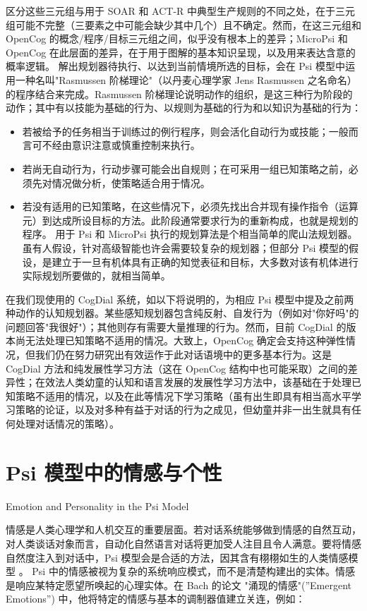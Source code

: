 区分这些三元组与用于 SOAR 和 ACT-R 中典型生产规则的不同之处，在于三元组可能不完整（三要素之中可能会缺少其中几个）且不确定。然而，在这三元组和 OpenCog 的概念/程序/目标三元组之间，似乎没有根本上的差异；MicroPsi 和 OpenCog 在此层面的差异，在于用于图解的基本知识呈现，以及用来表达含意的概率逻辑。
解出规划器待执行、以达到当前情境所选的目标，会在 Psi 模型中运用一种名叫"Rasmussen 阶梯理论"（以丹麦心理学家 Jens Rasmussen 之名命名）的程序结合来完成。Rasmussen 阶梯理论说明动作的组织，是这三种行为阶段的动作；其中有以技能为基础的行为、以规则为基础的行为和以知识为基础的行为：

\begin{itemize}
\item 若被给予的任务相当于训练过的例行程序，则会活化自动行为或技能；一般而言可不经由意识注意或慎重控制来执行。 
\item 若尚无自动行为，行动步骤可能会出自规则；在可采用一组已知策略之前，必须先对情况做分析，使策略适合用于情况。 
\item 若没有适用的已知策略，在这些情况下，必须先找出合并现有操作指令（运算元）到达成所设目标的方法。此阶段通常要求行为的重新构成，也就是规划的程序。
用于 Psi 和 MicroPsi 执行的规划算法是个相当简单的爬山法规划器。虽有人假设，针对高级智能也许会需要较复杂的规划器；但部分 Psi 模型的假设，是建立于一旦有机体具有正确的知觉表征和目标，大多数对该有机体进行实际规划所要做的，就相当简单。
\end{itemize}


在我们现使用的 CogDial 系统，如以下将说明的，为相应 Psi 模型中提及之前两种动作的认知规划器。某些感知规划器包含纯反射、自发行为（例如对"你好吗"的问题回答"我很好"）；其他则存有需要大量推理的行为。然而，目前 CogDial 的版本尚无法处理已知策略不适用的情况。大致上，OpenCog 确定会支持这种弹性情况，但我们仍在努力研究出有效运作于此对话语境中的更多基本行为。这是 CogDial 方法和纯发展性学习方法（这在 OpenCog 结构中也可能采取）之间的差异性；在效法人类幼童的认知和语言发展的发展性学习方法中，该基础在于处理已知策略不适用的情况，以及在此等情况下学习策略（虽有出生即具有相当高水平学习策略的论证，以及对多种有益于对话的行为之成见，但幼童并非一出生就具有任何处理对话情况的策略）。

\section{Psi 模型中的情感与个性}{Emotion and Personality in the Psi Model}

情感是人类心理学和人机交互的重要层面。若对话系统能够做到情感的自然互动，对人类谈话对象而言，自动化自然语言对话将更加受人注目且令人满意。要将情感自然度注入到对话中，Psi 模型会是合适的方法，因其含有栩栩如生的人类情感模型 。
Psi 中的情感被视为复杂的系统响应模式，而不是清楚构建出的实体。情感是响应某特定愿望所唤起的心理实体。在 Bach 的论文 \cite{Bach2012} "涌现的情感"(”Emergent Emotions”) 中，他将特定的情感与基本的调制器值建立关连，例如：

